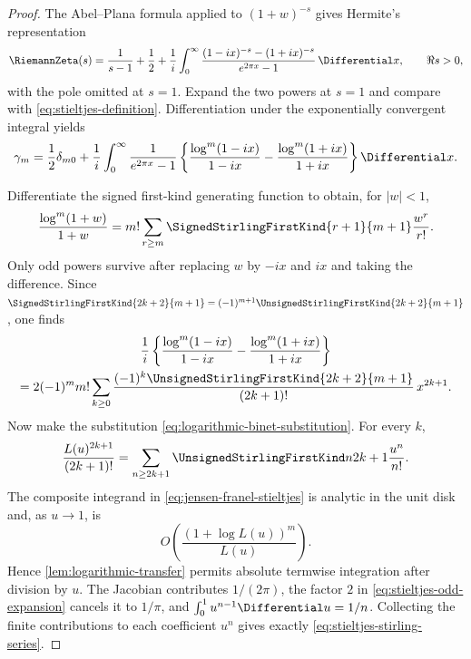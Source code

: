 \documentclass[11pt,a4paper,oneside,openany]{book}
\theoremstyle{definition}
\theoremstyle{remark}
\begin{document}
\begin{proof}
The Abel--Plana formula applied to $(1+w)^{-s}$ gives Hermite's representation
\begin{equation}
\label{eq:hermite-zeta}
 \RiemannZeta(s)=\frac1{s-1}+\frac12+\frac1i\int_0^\infty
 \frac{(1-ix)^{-s}-(1+ix)^{-s}}{e^{2\pi x}-1}\,\Differential x,
 \qquad \Re s>0,
\end{equation}
with the pole omitted at $s=1$.  Expand the two powers at $s=1$ and compare with
\eqref{eq:stieltjes-definition}.  Differentiation under the exponentially
convergent integral yields
\begin{equation}
\label{eq:jensen-franel-stieltjes}
 \gamma_m=\frac12\delta_{m0}+\frac1i\int_0^\infty\frac1{e^{2\pi x}-1}
 \left\{
 \frac{\log^m(1-ix)}{1-ix}
 -\frac{\log^m(1+ix)}{1+ix}
 \right\}\Differential x.
\end{equation}

Differentiate the signed first-kind generating function to obtain, for $|w|<1$,
\begin{equation}
\label{eq:log-power-over-linear}
 \frac{\log^m(1+w)}{1+w}
 =m!\sum_{r\ge m}\SignedStirlingFirstKind{r+1}{m+1}\frac{w^r}{r!}.
\end{equation}
Only odd powers survive after replacing $w$ by $-ix$ and $ix$ and taking the
difference.  Since
$\SignedStirlingFirstKind{2k+2}{m+1}=(-1)^{m+1}\UnsignedStirlingFirstKind{2k+2}{m+1}$, one finds
\begin{multline}
\label{eq:stieltjes-odd-expansion}
 \frac1i\left\{
 \frac{\log^m(1-ix)}{1-ix}
 -\frac{\log^m(1+ix)}{1+ix}
 \right\}\\
 =2(-1)^m m!\sum_{k\ge0}
 \frac{(-1)^k\UnsignedStirlingFirstKind{2k+2}{m+1}}{(2k+1)!}\,x^{2k+1}.
\end{multline}
Now make the substitution \eqref{eq:logarithmic-binet-substitution}.  For every
$k$,
\[
 \frac{L(u)^{2k+1}}{(2k+1)!}
 =\sum_{n\ge2k+1}\UnsignedStirlingFirstKind n{2k+1}\frac{u^n}{n!}.
\]
The composite integrand in \eqref{eq:jensen-franel-stieltjes} is analytic in the
unit disk and, as $u\to1$, is
\[
 O\!\left(\frac{(1+\log L(u))^m}{L(u)}\right).
\]
Hence \cref{lem:logarithmic-transfer} permits absolute termwise integration after
division by $u$.  The Jacobian contributes $1/(2\pi)$, the factor $2$ in
\eqref{eq:stieltjes-odd-expansion} cancels it to $1/\pi$, and
$\int_0^1u^{n-1}\Differential u=1/n$.  Collecting the finite contributions to each
coefficient $u^n$ gives exactly \eqref{eq:stieltjes-stirling-series}.
\end{proof}
\end{document}
